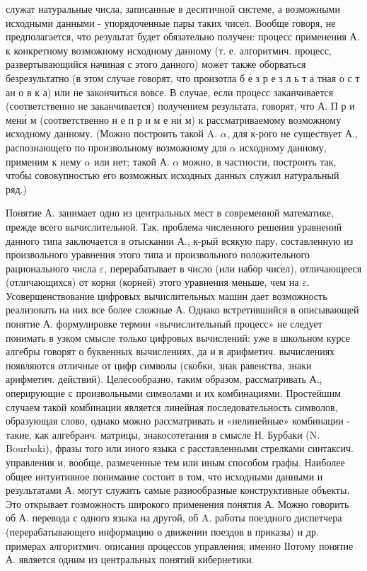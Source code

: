 \documentclass[10pt]{article}
\begin{document}
служат натуральные числа, записанные в десятичной системе, а возможными исходными данными - упорядоченные пары таких чисел. Вообще говоря, не предполагается, что результат будет обязательно получен: процесс применения А. к конкретному возможному исходному данному (т. е. алгоритмич. процесс, развертывающийся начиная с этого данного) может также оборваться безрезультатно (в этом случае говорят, что произотла б е з р е з л ь т а тная о с т ан о в к а) или не закончиться вовсе. В случае, если процесс заканчивается (соответственно не заканчивается) получением результата, говорят, что А. П р и мени́ м (соответственно н е п р и м е ни́ м) к рассматриваемому возможному исходному данному. (Можно построить такой $\mathrm{A}$. $\alpha$, для к-рого не существует А., распознающего по произвольному возможному для $\alpha$ исходному данному, применим к нему $\alpha$ или нет; такой А. $\alpha$ можно, в частности, построить так, чтобы совокупностью его возможных исходных данных служил натуральный ряд.)



Понятие А. занимает одно из центральных мест в современной математике, прежде всего вычислительной. Так, проблема численного решения уравнений данного типа заключается в отыскании А., к-рый всякую пару, составленную из произвольного уравнения этого типа и произвольного положительного рационального числа $\varepsilon$, перерабатывает в число (или набор чисел), отличающееся (отличающихся) от корня (корней) этого уравнения меньше, чем на $\varepsilon$. Усовершенствование цифровых вычислительных машин дает возможность реализовать на них все более сложные А. Однако встретившийся в описывающей понятие А. формулировке термин «вычислительный процесс» не следует понимать в узком смысле только цифровых вычислений: уже в школьном курсе алгебры говорят о буквенных вычислениях, да и в арифметич. вычислениях появляются отличные от цифр символы (скобки, знак равенства, знаки арифметич. действий). Целесообразно, таким образом, рассматривать А., оперирующие с произвольными символами и их комбинациями. Простейшим случаем такой комбинации является линейная последовательность символов, образующая слово, однако можно рассматривать и «нелинейные» комбинации - такие, как алгебраич. матрицы, знакосотетания в смысле Н. Бурбаки (N. Bourbaki), фразы того или иного языка с расставленными стрелками синтаксич. управления и, вообще, размеченные тем или иным способом графы. Наиболее общее интуитивное понимание состоит в том, что исходными данными и результатами А. могут служить самые разиообразные конструктивные объекты. Это открывает гозможность широкого применения понятия А. Можно говорить об А. перевода с одного языка на другой, об A. работы поездного диспетчера (перерабатывающего информацию о движении поездов в приказы) и др. примерах алгоритмич. описания процессов управления; именно ІІотому понятие А. является одним из центральных понятий кибернетики.
\end{document}
